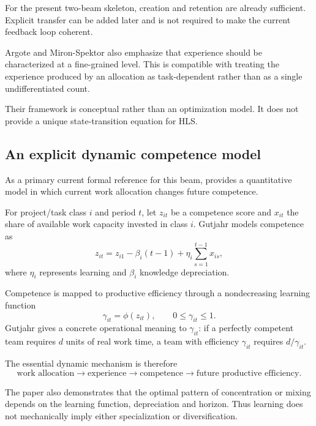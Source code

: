 For the present two-beam skeleton, creation and retention are already sufficient. Explicit
transfer can be added later and is not required to make the current feedback loop coherent.

Argote and Miron-Spektor also emphasize that experience should be characterized at a
fine-grained level. This is compatible with treating the experience produced by an allocation
as task-dependent rather than as a single undifferentiated count.

Their framework is conceptual rather than an optimization model. It does not provide a unique
state-transition equation for HLS.

\subsection{An explicit dynamic competence model}

As a primary current formal reference for this beam, \citet{gutjahr2011} provides a
quantitative model in which current work allocation changes future competence.

For project/task class \(i\) and period \(t\), let \(z_{it}\) be a competence score and
\(x_{it}\) the share of available work capacity invested in class \(i\). Gutjahr models
competence as
\begin{equation}
z_{it}
=
z_{i1}
-
\beta_i(t-1)
+
\eta_i\sum_{s=1}^{t-1}x_{is},
\label{eq:gutjahr}
\end{equation}
where \(\eta_i\) represents learning and \(\beta_i\) knowledge depreciation.

Competence is mapped to productive efficiency through a nondecreasing learning function
\begin{equation}
\gamma_{it}=\phi(z_{it}),\qquad 0\leq\gamma_{it}\leq 1.
\end{equation}
Gutjahr gives a concrete operational meaning to \(\gamma_{it}\): if a perfectly competent
team requires \(d\) units of real work time, a team with efficiency \(\gamma_{it}\) requires
\(d/\gamma_{it}\).

The essential dynamic mechanism is therefore
\begin{equation}
\text{work allocation}
\longrightarrow
\text{experience}
\longrightarrow
\text{competence}
\longrightarrow
\text{future productive efficiency}.
\end{equation}

The paper also demonstrates that the optimal pattern of concentration or mixing depends on
the learning function, depreciation and horizon. Thus learning does not mechanically imply
either specialization or diversification.

